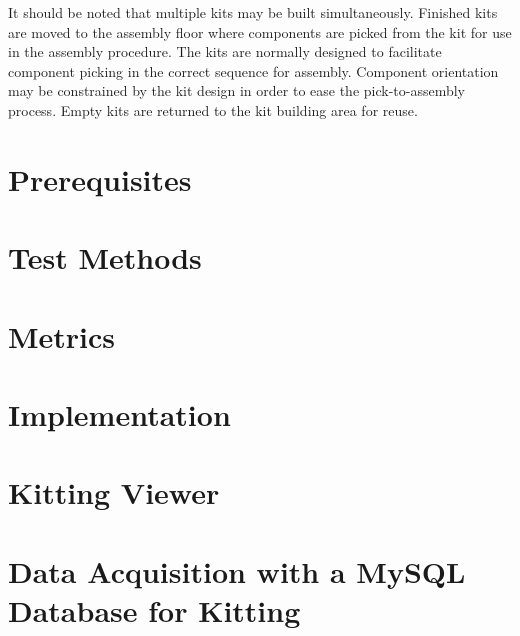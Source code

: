 It should be noted that multiple kits may be built simultaneously.
Finished kits are moved to the assembly floor where components
are picked from the kit for use in the assembly procedure.
The kits are normally designed to facilitate component picking in the correct
sequence for assembly. Component orientation may be constrained
by the kit design in order to ease the pick-to-assembly process.
Empty kits are returned to the kit building area for reuse.

\renewcommand{\topfraction}{1.0}
\setcounter{topnumber}{100}

\section{Prerequisites}
\label{sect:Prerequisites}


\section{Test Methods}
\label{sect:TestMethods}


\section{Metrics}
\label{sect:Metrics}


\section{Implementation}
\label{sect:Implementation}


\section{Kitting Viewer}
\label{sect:KittingViewer}



\section{Data Acquisition with a MySQL Database for Kitting}
\label{sect:cppClasses}


